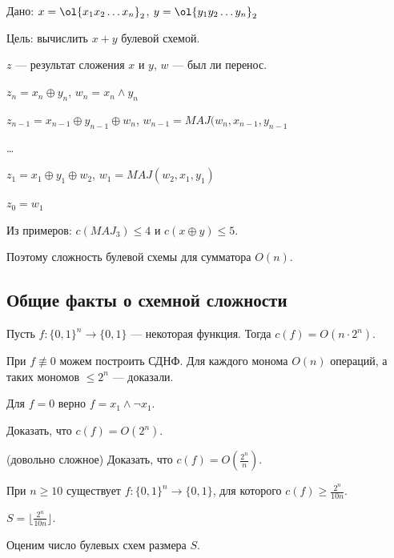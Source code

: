 Дано:
\( x = \ol{x_1 x_2 \ldots x_n}_2 \),
\( y = \ol{y_1 y_2 \ldots y_n}_2 \)

Цель: вычислить \( x + y \) булевой схемой.

\( z \) --- результат сложения \( x \) и \( y \), \( w \) --- был ли перенос.

\( z_n = x_n \oplus y_n \), \( w_n = x_n \land y_n \)

\( z_{n - 1} = x_{n - 1} \oplus y_{n - 1} \oplus w_n \), \( w_{n - 1} = MAJ(w_n, x_{n - 1}, y_{n - 1} \)

\ldots

\( z_1 = x_1 \oplus y_1 \oplus w_2 \), \( w_1 = MAJ(w_2, x_1, y_1) \)

\( z_0 = w_1 \)

Из примеров: \( c(MAJ_3) \leq 4 \) и \( c(x \oplus y) \leq 5 \).

Поэтому сложность булевой схемы для сумматора \( O(n) \).

\subsection{Общие факты о схемной сложности}

\begin{thrm}{}{}
    Пусть \( f : \{ 0, 1 \}^n \to \{ 0, 1 \} \) --- некоторая функция.
    Тогда \( c(f) = O(n \cdot 2^n) \).
\end{thrm}

При \( f \not\equiv 0 \) можем построить СДНФ.
Для каждого монома \( O(n) \) операций, а таких мономов \( \leq 2^n \) --- доказали.

Для \( f = 0 \) верно \( f = x_1 \land \lnot x_1 \).

\begin{exercise}{}{}
    Доказать, что \( c(f) = O(2^n) \).
\end{exercise}

\begin{exercise}{(довольно сложное)}{}
    Доказать, что \( \displaystyle c(f) = O \left( \frac{2^n}{n} \right) \).
\end{exercise}

\begin{thrm}{}{}
    При \( n \geq 10 \) существует \( f : \{ 0, 1 \}^n \to \{ 0, 1 \} \), для которого \( c(f) \geq \frac{2^n}{10 n} \).
\end{thrm}

\( S = \lfloor \frac{2^n}{10 n} \rfloor \).

Оценим число булевых схем размера \( S \).

